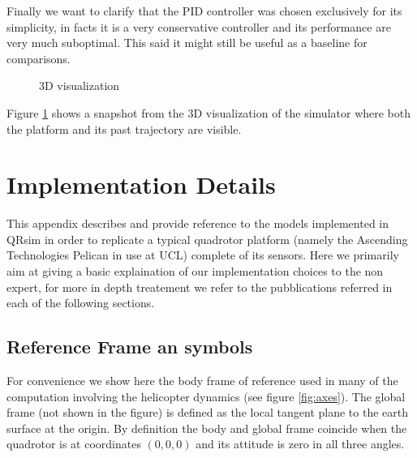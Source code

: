 \documentclass[a4paper,11pt]{report}
\newcommand{\sname}{QRsim\xspace}
\begin{document}
Finally we want to clarify that the PID controller was chosen exclusively for its simplicity, in facts it is a very conservative controller and its performance are very much suboptimal. This said it might still be useful as a baseline for comparisons. 

\begin{center}
\begin{figure}
\label{fig:3d}
 \caption{3D visualization}
\end{figure}
\end{center}

Figure \ref{fig:3d} shows a snapshot from the 3D visualization of the simulator where both the platform and its past trajectory are visible.


\appendix
\chapter{Implementation Details}

This appendix describes and provide reference to the models implemented in \sname in order to replicate a typical quadrotor platform (namely the Ascending Technologies Pelican \cite{asctec2011pelican} in use at UCL) complete of its sensors.
Here we primarily aim at giving a basic explaination of our implementation choices to the non expert, for more in depth treatement we refer to the pubblications referred in each of the following sections.

\section{Reference Frame an symbols}

For convenience we show here the body frame of reference used in many of the computation involving the helicopter dynamics (see figure \ref{fig:axes}). 
The global frame (not shown in the figure) is defined as the local tangent plane to the earth surface at the origin. By definition the body and global frame coincide when the quadrotor is at coordinates $(0,0,0)$ and its attitude is zero in all three angles.
\end{document}
